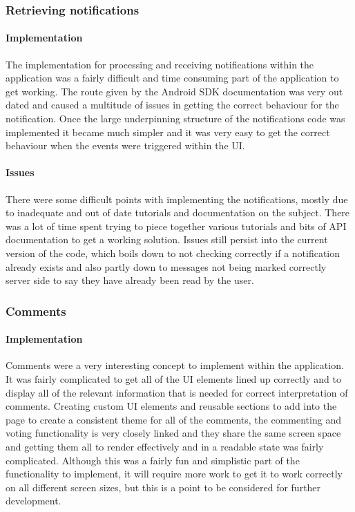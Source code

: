 \subsubsection{Retrieving notifications}

\paragraph*{Implementation}

The implementation for processing and receiving notifications within the application was a fairly difficult and time consuming part of the application to get working. The route given by the Android SDK documentation was very out dated and caused a multitude of issues in getting the correct behaviour for the notification. Once the large underpinning structure of the notifications code was implemented it became much simpler and it was very easy to get the correct behaviour when the events were triggered within the UI.

\paragraph*{Issues}

There were some difficult points with implementing the notifications, mostly due to inadequate and out of date tutorials and documentation on the subject. There was a lot of time spent trying to piece together various tutorials and bits of API documentation to get a working solution. Issues still persist into the current version of the code, which boils down to not checking correctly if a notification already exists and also partly down to messages not being marked correctly server side to say they have already been read by the user.

\subsubsection{Comments}

\paragraph*{Implementation}

Comments were a very interesting concept to implement within the application. It was fairly complicated to get all of the UI elements lined up correctly and to display all of the relevant information that is needed for correct interpretation of comments. Creating custom UI elements and reusable sections to add into the page to create a consistent theme for all of the comments, the commenting and voting functionality is very closely linked and they share the same screen space and getting them all to render effectively and in a readable state was fairly complicated. Although this was a fairly fun and simplistic part of the functionality to implement, it will require more work to get it to work correctly on all different screen sizes, but this is a point to be considered for further development.

